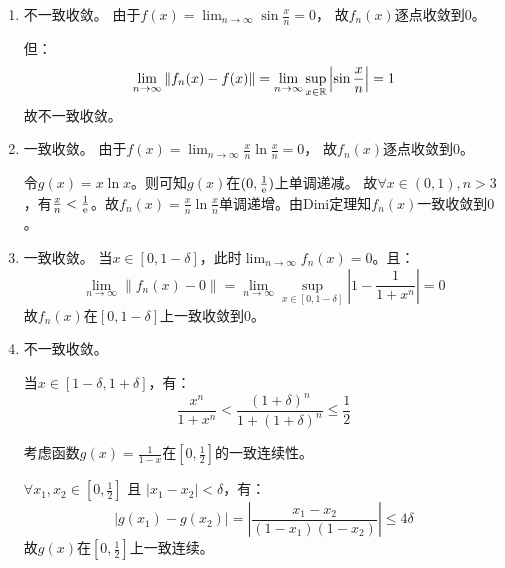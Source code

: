 \begin{solution}
    \begin{enumerate}
        \item 不一致收敛。
            由于\(f(x)=\lim_{n \to \infty} \sin \frac{x}{n} = 0\)，
            故\(f_{n}(x)\)逐点收敛到\(0\)。

            但：
            \[
                \lim_{n \to \infty} \left\lVert f_{n}(x) -
                f(x) \right\rVert
                = \lim_{n \to \infty} \sup_{x \in
                \mathbb{R}} \left\lvert \sin
                \frac{x}{n} \right\rvert
                = 1
            \]
            故不一致收敛。

        \item 一致收敛。
            由于\(f(x)=\lim_{n \to \infty} \frac{x}{n} \ln
            \frac{x}{n} = 0\)，
            故\(f_{n}(x)\)逐点收敛到\(0\)。

            令\(g(x)=x \ln x\)。则可知\(g(x)\)在\((0,\frac{1}{\mathrm{e}})\)上单调递减。
            故\(\forall x \in (0,1), n > 3\)，有\(\frac{x}{n} <
            \frac{1}{\mathrm{e}}\)。故\(f_{n}(x) = \frac{x}{n} \ln
            \frac{x}{n}\)单调递增。由Dini定理知\(f_{n}(x)\)一致收敛到\(0\)。

        \item 一致收敛。
            当\(x \in [0,1-\delta]\)，此时\(\lim_{n \to
            \infty}f_{n}(x) = 0\)。且：
            \[
                \lim_{n \to \infty}\left\lVert f_{n}(x) - 0
                \right\rVert
                = \lim_{n \to \infty} \sup_{x \in
                [0,1-\delta]} \left\vert 1 -
                \frac{1}{1+ x^{n}} \right\vert
                = 0
            \]
            故\(f_{n}(x)\)在\([0,1-\delta]\)上一致收敛到\(0\)。

        \item 不一致收敛。

            当\(x \in [1-\delta,1+\delta]\)，有：
            \[
                \frac{x^{n}}{1 + x^{n}} < \frac{(1+\delta)^{n}}{1+
                (1+\delta)^{n}} \le \frac{1}{2}
            \]

            考虑函数\(g(x) = \frac{1}{1-x}\)在\([0,\frac{1}{2}]\)的一致连续性。

            \(\forall x_1, x_2 \in [0, \frac{1}{2}]\) 且
            \(\left\vert x_1 - x_2
            \right\vert < \delta\)，有：
            \[
                \left\vert g(x_1) - g(x_2) \right\vert
                = \left\vert \frac{x_1 -
                x_2}{(1-x_1)(1-x_2)} \right\vert
                \le 4 \delta
            \]
            故\(g(x)\)在\([0,\frac{1}{2}]\)上一致连续。


\end{enumerate}
\end{solution}
